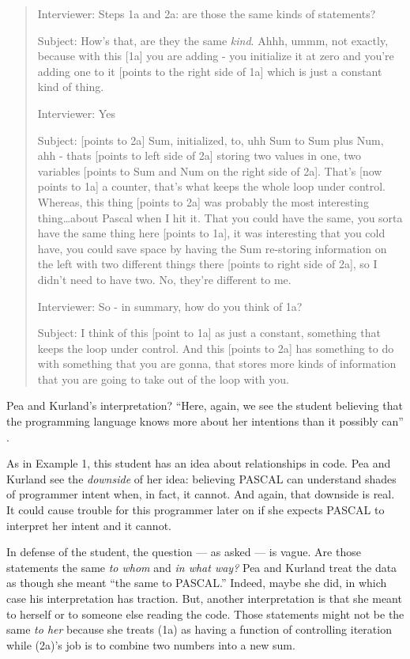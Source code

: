 \begin{quote}
  Interviewer: Steps 1a and 2a: are those the same kinds of statements?

  Subject: How's that, are they the same \emph{kind}. Ahhh, ummm, not
  exactly, because with this {[}1a{]} you are adding - you initialize it
  at zero and you're adding one to it {[}points to the right side of 1a{]}
  which is just a constant kind of thing.

  Interviewer: Yes

  Subject: {[}points to 2a{]} Sum, initialized, to, uhh Sum to Sum plus
  Num, ahh - thats {[}points to left side of 2a{]} storing two values in
  one, two variables {[}points to Sum and Num on the right side of 2a{]}.
  That's {[}now points to 1a{]} a counter, that's what keeps the whole
  loop under control. Whereas, this thing {[}points to 2a{]} was probably
  the most interesting thing\ldots{}about Pascal when I hit it. That you
  could have the same, you sorta have the same thing here {[}points to
  1a{]}, it was interesting that you cold have, you could save space by
  having the Sum re-storing information on the left with two different
  things there {[}points to right side of 2a{]}, so I didn't need to have
  two. No, they're different to me.

  Interviewer: So - in summary, how do you think of 1a?

  Subject: I think of this {[}point to 1a{]} as just a constant, something
  that keeps the loop under control. And this {[}points to 2a{]} has
  something to do with something that you are gonna, that stores more
  kinds of information that you are going to take out of the loop with
  you. \cite{bonar_uncovering_1983}
\end{quote}


Pea and Kurland's interpretation? ``Here, again, we see the student believing
that the programming language knows more about her intentions than it
possibly can'' \cite{pea_cognitive_1983}.

As in Example 1, this student has an idea about relationships in code. Pea and Kurland
\cite{pea_cognitive_1983} see the \emph{downside} of her idea: believing PASCAL can understand
shades of programmer intent when, in fact, it cannot. And again, that
downside is real. It could cause trouble for this programmer later on if
she expects PASCAL to interpret her intent and it cannot.

In defense of the student, the question --- as asked --- is vague. Are
those statements the same \emph{to whom} and \emph{in what way?} Pea and Kurland
treat the data as though she meant ``the same to PASCAL.'' Indeed,
maybe she did, in which case his interpretation has traction. But,
another interpretation is that she meant to herself or to someone else
reading the code. Those statements might not be the same \emph{to her}
because she treats (1a) as having a function of controlling iteration
while (2a)'s job is to combine two numbers into a new sum.

